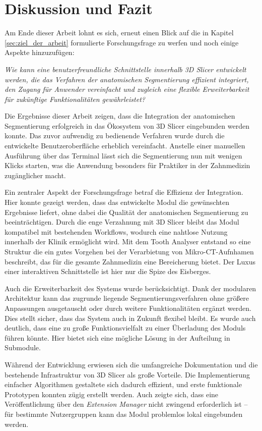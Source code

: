 \chapter{Diskussion und Fazit}
\label{chap:diskussion} Am Ende dieser Arbeit lohnt es sich, erneut einen Blick
auf die in Kapitel \ref{sec:ziel_der_arbeit} formulierte Forschungsfrage zu
werfen und noch einige Aspekte hinzuzufügen:

\textit{Wie kann eine benutzerfreundliche Schnittstelle innerhalb 3D Slicer
entwickelt werden, die das Verfahren der anatomischen Segmentierung effizient integriert,
den Zugang für Anwender vereinfacht und zugleich eine flexible Erweiterbarkeit
für zukünftige Funktionalitäten gewährleistet?}

Die Ergebnisse dieser Arbeit zeigen, dass die Integration der anatomischen Segmentierung
erfolgreich in das Ökosystem von 3D Slicer eingebunden werden konnte. Das zuvor
aufwendig zu bedienende Verfahren wurde durch die entwickelte Benutzeroberfläche
erheblich vereinfacht. Anstelle einer manuellen Ausführung über das Terminal lässt
sich die Segmentierung nun mit wenigen Klicks starten, was die Anwendung
besonders für Praktiker in der Zahnmedizin zugänglicher macht.

Ein zentraler Aspekt der Forschungsfrage betraf die Effizienz der Integration. Hier
konnte gezeigt werden, dass das entwickelte Modul die gewünschten Ergebnisse
liefert, ohne dabei die Qualität der anatomischen Segmentierung zu beeinträchtigen.
Durch die enge Verzahnung mit 3D Slicer bleibt das Modul kompatibel mit
bestehenden Workflows, wodurch eine nahtlose Nutzung innerhalb der Klinik ermöglicht
wird. Mit dem Tooth Analyser entstand so eine Struktur die ein gutes Vorgehen
bei der Verarbietung von Mikro-CT-Aufnhamen beschreibt, das für die gesamte Zahnmedizin
eine Bereicherung bietet. Der Luxus einer interaktiven Schnittstelle ist hier
nur die Spize des Eisberges.

Auch die Erweiterbarkeit des Systems wurde berücksichtigt. Dank der modularen Architektur
kann das zugrunde liegende Segmentierungsverfahren ohne größere Anpassungen ausgetauscht
oder durch weitere Funktionalitäten ergänzt werden. Dies stellt sicher, dass das
System auch in Zukunft flexibel bleibt. Es wurde auch deutlich, dass eine zu große
Funktionsvielfalt zu einer Überladung des Moduls führen könnte. Hier bietet sich
eine mögliche Lösung in der Aufteilung in Submodule.

Während der Entwicklung erwiesen sich die umfangreiche Dokumentation und die
bestehende Infrastruktur von 3D Slicer als große Vorteile. Die Implementierung einfacher
Algorithmen gestaltete sich dadurch effizient, und erste funktionale Prototypen
konnten zügig erstellt werden. Auch zeigte sich, dass eine Veröffentlichung über
den \textit{Extension Manager} nicht zwingend erforderlich ist – für bestimmte Nutzergruppen
kann das Modul problemlos lokal eingebunden werden.

